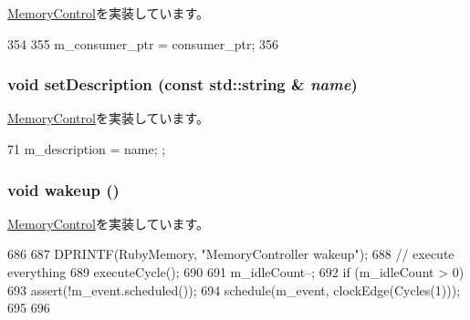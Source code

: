 \hyperlink{classMemoryControl_ac57bc43eacdddc1423b4f98ead12fd1c}{MemoryControl}を実装しています。


\begin{DoxyCode}
354 {
355     m_consumer_ptr = consumer_ptr;
356 }
\end{DoxyCode}
\hypertarget{classRubyMemoryControl_a9cdbe64eebafb111a124edec55ed2340}{
\subsubsection[{setDescription}]{\setlength{\rightskip}{0pt plus 5cm}void setDescription (const std::string \& {\em name})}}
\label{classRubyMemoryControl_a9cdbe64eebafb111a124edec55ed2340}


\hyperlink{classMemoryControl_aaf16ee4e399ebed0a6434dd085a6fc10}{MemoryControl}を実装しています。


\begin{DoxyCode}
71 { m_description = name; };
\end{DoxyCode}
\hypertarget{classRubyMemoryControl_ae674290a26ecbd622c5160e38e8a4fe9}{
\subsubsection[{wakeup}]{\setlength{\rightskip}{0pt plus 5cm}void wakeup ()}}
\label{classRubyMemoryControl_ae674290a26ecbd622c5160e38e8a4fe9}


\hyperlink{classMemoryControl_a623e3e7d1b1c725d70009f7b01a421b9}{MemoryControl}を実装しています。


\begin{DoxyCode}
686 {
687     DPRINTF(RubyMemory, "MemoryController wakeup\n");
688     // execute everything
689     executeCycle();
690 
691     m_idleCount--;
692     if (m_idleCount > 0) {
693         assert(!m_event.scheduled());
694         schedule(m_event, clockEdge(Cycles(1)));
695     }
696 }
\end{DoxyCode}


